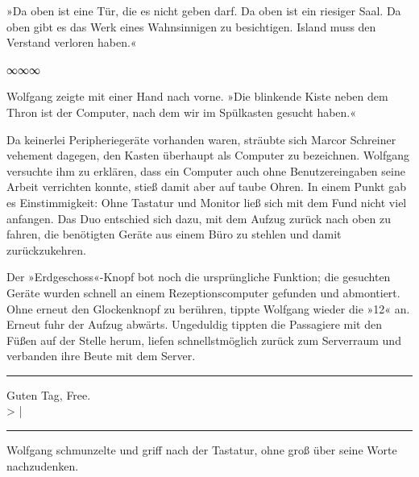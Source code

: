 »Da oben ist eine Tür, die es nicht geben darf. Da oben ist ein riesiger Saal. Da oben gibt es das Werk eines Wahnsinnigen zu besichtigen. Island muss den Verstand verloren haben.«

\begin{center}
∞∞∞
\end{center}

Wolfgang zeigte mit einer Hand nach vorne. »Die blinkende Kiste neben dem Thron ist der Computer, nach dem wir im Spülkasten gesucht haben.«

Da keinerlei Peripheriegeräte vorhanden waren, sträubte sich Marcor Schreiner vehement dagegen, den Kasten überhaupt als Computer zu bezeichnen. Wolfgang versuchte ihm zu erklären, dass ein Computer auch ohne Benutzereingaben seine Arbeit verrichten konnte, stieß damit aber auf taube Ohren. In einem Punkt gab es Einstimmigkeit: Ohne Tastatur und Monitor ließ sich mit dem Fund nicht viel anfangen. Das Duo entschied sich dazu, mit dem Aufzug zurück nach oben zu fahren, die benötigten Geräte aus einem Büro zu stehlen und damit zurückzukehren.

Der »Erdgeschoss«-Knopf bot noch die ursprüngliche Funktion; die gesuchten Geräte wurden schnell an einem Rezeptionscomputer gefunden und abmontiert. Ohne erneut den Glockenknopf zu berühren, tippte Wolfgang wieder die »12« an. Erneut fuhr der Aufzug abwärts. Ungeduldig tippten die Passagiere mit den Füßen auf der Stelle herum, liefen schnellstmöglich zurück zum Serverraum und verbanden ihre Beute mit dem Server.

\noindent \parbox{\textwidth}{ \vspace{3ex} \hrule \vspace{3ex}

    \begin{tiny}
    \begin{ttfamily}

\noindent Guten Tag, Free.\\
\noindent > |

    \end{ttfamily}
    \end{tiny}

\vspace{3ex} \hrule \vspace{3ex} }

Wolfgang schmunzelte und griff nach der Tastatur, ohne groß über seine Worte nachzudenken.

